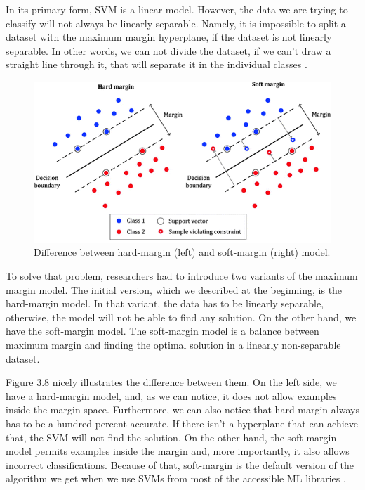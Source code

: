 \documentclass[times, utf8, seminar]{fer}
\begin{document}

In its primary form, SVM is a linear model. However, the data we are trying to classify will not always be linearly separable. Namely, it is impossible to split a dataset with the maximum margin hyperplane, if the dataset is not linearly separable. In other words, we can not divide the dataset, if we can't draw a straight line through it, that will separate it in the individual classes \citep{svm}.

\begin{figure}[h]
	\centering
	\includegraphics[width=12cm]{margin}
	\caption{Difference between hard-margin (left) and soft-margin (right) model. \protect \footnotemark}
\end{figure}


To solve that problem, researchers had to introduce two variants of the maximum margin model. The initial version, which we described at the beginning, is the hard-margin model. In that variant, the data has to be linearly separable, otherwise, the model will not be able to find any solution. On the other hand, we have the soft-margin model. The soft-margin model is a balance between maximum margin and finding the optimal solution in a linearly non-separable dataset.

Figure 3.8 nicely illustrates the difference between them. On the left side, we have a hard-margin model, and, as we can notice, it does not allow examples inside the margin space. Furthermore, we can also notice that hard-margin always has to be a hundred percent accurate. If there isn't a hyperplane that can achieve that, the SVM will not find the solution. On the other hand, the soft-margin model permits examples inside the margin and, more importantly, it also allows incorrect classifications. Because of that, soft-margin is the default version of the algorithm we get when we use SVMs from most of the accessible ML libraries \citep{fradkin2006}.
\end{document}
